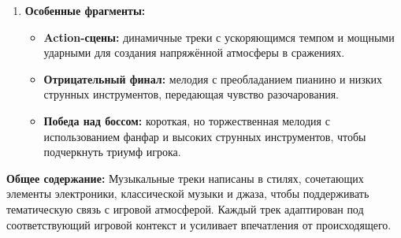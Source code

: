\begin{enumerate}
    \item \textbf{Особенные фрагменты:}  
    \begin{itemize}
        \item \textbf{Action-сцены:} динамичные треки с ускоряющимся темпом и мощными ударными для создания напряжённой атмосферы в сражениях.  
        \item \textbf{Отрицательный финал:} мелодия с преобладанием пианино и низких струнных инструментов, передающая чувство разочарования.  
        \item \textbf{Победа над боссом:} короткая, но торжественная мелодия с использованием фанфар и высоких струнных инструментов, чтобы подчеркнуть триумф игрока.  
    \end{itemize}
\end{enumerate}

\textbf{Общее содержание:}  
Музыкальные треки написаны в стилях, сочетающих элементы электроники, классической музыки и джаза, чтобы поддерживать тематическую связь с игровой атмосферой. Каждый трек адаптирован под соответствующий игровой контекст и усиливает впечатления от происходящего.